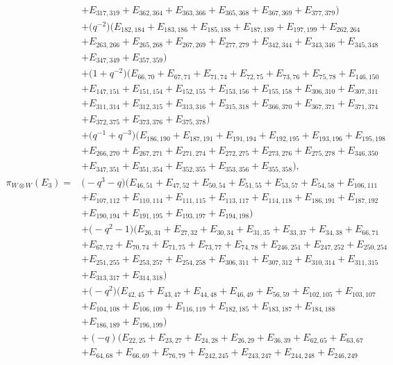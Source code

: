 \documentclass[pdftex]{sigma}
\numberwithin{equation}{section}
\theoremstyle{definition}
\begin{document}
\begin{align*}
&+E_{317,319}+E_{362,364}+E_{363,366}+E_{365,368}+E_{367,369}+E_{377,379})
\\
&+\bigl(q^{-2}\bigr)(E_{182,184}+E_{183,186}+E_{185,188}+E_{187,189}+E_{197,199}+E_{262,264}\\
&+E_{263,266}+E_{265,268}+E_{267,269}+E_{277,279}+E_{342,344}+E_{343,346}+E_{345,348}\\
&+E_{347,349}+E_{357,359})
\\
&+\bigl(1 + q^{-2}\bigr)(E_{66,70}+E_{67,71}+E_{71,74}+E_{72,75}+E_{73,76}+E_{75,78}+E_{146,150}\\
&+E_{147,151}+E_{151,154}+E_{152,155}+E_{153,156}+E_{155,158}+E_{306,310}+E_{307,311}\\
&+E_{311,314}+E_{312,315}+E_{313,316}+E_{315,318}+E_{366,370}+E_{367,371}+E_{371,374}\\
&+E_{372,375}+E_{373,376}+E_{375,378})
\\
&+\bigl(q^{-1} + q^{-3}\bigr)(E_{186,190}+E_{187,191}+E_{191,194}+E_{192,195}+E_{193,196}+E_{195,198}\\
&+E_{266,270}+E_{267,271}+E_{271,274}+E_{272,275}+E_{273,276}+E_{275,278}+E_{346,350}\\
&+E_{347,351}+E_{351,354}+E_{352,355}
+E_{353,356}+E_{355,358}),\\
 \pi_{W \otimes W}(E_3) ={}&
\bigl(-q^3 - q\bigr)(E_{46,51}+E_{47,52}+E_{50,54}+E_{51,55}+E_{53,57}+E_{54,58}+E_{106,111}\\
&
+E_{107,112}+E_{110,114}+E_{111,115}+E_{113,117}+E_{114,118}+E_{186,191}+E_{187,192}\\
&+E_{190,194}+E_{191,195}+E_{193,197}+E_{194,198})\\
&+\bigl(-q^2 - 1\bigr)(E_{26,31}+E_{27,32}+E_{30,34}+E_{31,35}+E_{33,37}+E_{34,38}+E_{66,71}\\
&+E_{67,72}+E_{70,74}+E_{71,75}+E_{73,77}+E_{74,78}+E_{246,251}+E_{247,252}+E_{250,254}\\
&+E_{251,255}+E_{253,257}+E_{254,258}+E_{306,311}+E_{307,312}+E_{310,314}+E_{311,315}\\
&+E_{313,317}+E_{314,318})\\
&+\bigl(-q^2\bigr)(E_{42,45}+E_{43,47}+E_{44,48}+E_{46,49}+E_{56,59}+E_{102,105}+E_{103,107}\\
&+E_{104,108}+E_{106,109}+E_{116,119}+E_{182,185}+E_{183,187}+E_{184,188}\\
&+E_{186,189}+E_{196,199})
\\
&+(-q)(E_{22,25}+E_{23,27}+E_{24,28}+E_{26,29}+E_{36,39}+E_{62,65}+E_{63,67}\\
&+E_{64,68}+E_{66,69}+E_{76,79}+E_{242,245}+E_{243,247}+E_{244,248}+E_{246,249}\\

\end{align*}
\end{document}
